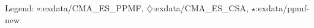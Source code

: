 Legend: {\color{NavyBlue}$\circ$}:exdata/CMA\_ES\_PPMF, {\color{Magenta}$\diamondsuit$}:exdata/CMA\_ES\_CSA, {\color{Orange}$\star$}:exdata/ppmf-new